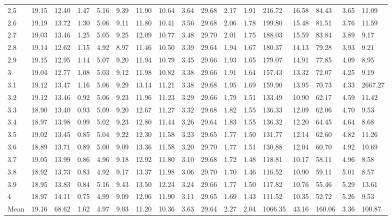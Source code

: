 \begin{adjustbox}{angle=90}
\begin{center}
\begin{tabular}{|l|llllllllllllllll|}
2.5&19.15&12.40&1.47&5.16&9.39&11.90&10.64&3.64&29.68&2.17&1.91&216.72&16.58&84.43&3.65&11.09  \\ 
2.6&19.19&13.72&1.30&5.06&9.11&11.80&10.41&3.56&29.68&2.06&1.78&199.80&15.48&81.51&3.76&11.59  \\ 
2.7&19.03&13.46&1.25&5.05&9.25&12.09&10.77&3.48&29.70&2.01&1.75&188.03&15.59&83.84&3.89&9.17  \\ 
2.8&19.14&12.62&1.15&4.92&8.97&11.46&10.50&3.39&29.64&1.94&1.67&180.37&14.13&79.28&3.93&9.21  \\ 
2.9&19.15&12.95&1.14&5.07&9.20&11.94&10.79&3.45&29.66&1.93&1.65&179.07&14.91&77.85&4.09&8.95  \\ 
3&19.04&12.77&1.08&5.03&9.12&11.98&10.82&3.38&29.66&1.91&1.64&157.43&13.32&72.07&4.25&9.19  \\ 
3.1&19.12&13.47&1.16&5.06&9.29&13.14&11.21&3.38&29.68&1.95&1.69&159.90&13.95&70.73&4.33&2667.27  \\ 
3.2&19.12&13.46&0.92&5.06&9.23&11.96&11.23&3.29&29.66&1.79&1.51&133.49&10.90&62.17&4.59&11.42  \\ 
3.3&18.90&13.40&0.93&5.09&9.20&12.67&11.27&3.32&29.68&1.82&1.55&136.33&12.09&62.06&4.70&9.53  \\ 
3.4&18.97&13.98&0.99&5.02&9.23&12.80&11.44&3.26&29.64&1.83&1.55&136.32&12.20&64.45&4.64&8.68  \\ 
3.5&19.02&13.45&0.85&5.04&9.22&12.30&11.58&3.23&29.65&1.77&1.50&131.77&12.14&62.60&4.82&11.26  \\ 
3.6&18.89&13.71&0.89&5.00&9.09&13.36&11.58&3.20&29.70&1.77&1.51&130.88&12.04&60.70&4.92&10.69  \\ 
3.7&19.05&13.99&0.86&4.96&9.18&12.92&11.80&3.10&29.68&1.72&1.48&118.81&10.17&58.11&4.96&8.58  \\ 
3.8&18.92&13.73&0.83&4.92&9.17&13.37&11.98&3.06&29.70&1.70&1.46&116.52&10.90&59.11&5.01&8.57  \\ 
3.9&18.95&13.83&0.84&5.16&9.43&13.50&12.24&3.24&29.66&1.77&1.50&117.82&10.76&55.46&5.29&13.61  \\ 
4&18.97&14.11&0.75&4.99&9.09&12.96&11.90&3.11&29.65&1.69&1.43&111.52&10.35&52.72&5.26&9.53  \\ \hline \hline
Mean&19.16&68.62&1.62&4.97&9.03&11.20&10.36&3.63&29.64&2.27&2.04&1066.35&43.16&160.06&3.36&100.87  \\ \hline
\end{tabular}
\end{center}
\end{adjustbox}





